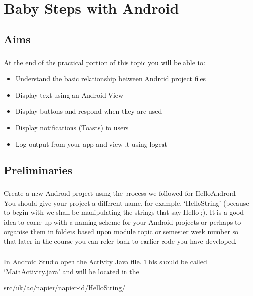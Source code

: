 \chapter{Baby Steps with Android}

\section{Aims}
\paragraph{} At the end of the practical portion of this topic you will be able to:

\begin{itemize}
\item Understand the basic relationship between Android project files
\item Display text using an Android View
\item Display buttons and respond when they are used
\item Display notifications (Toasts) to users
\item Log output from your app and view it using logcat
\end{itemize}

\section{Preliminaries}
\paragraph{} Create a new Android project using the process we followed for HelloAndroid. You should give your project a different name, for example, `HelloString' (because to begin with we shall be manipulating the strings that say Hello ;). It is a good idea to come up with a naming scheme for your Android projects or perhaps to organise them in folders based upon module topic or semester week number so that later in the course you can refer back to earlier code you have developed.

\paragraph{} In Android Studio open the Activity Java file. This should be called `MainActivity.java' and will be located in the 
\begin{framed}
src/uk/ac/napier/napier-id/HelloString/ 
\end{framed}
